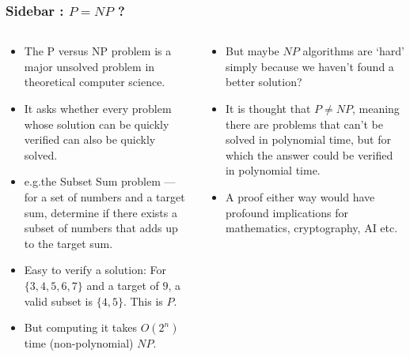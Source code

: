 \begin{frame}[fragile]
\frametitle{Sidebar : $P=NP$ ?}
\begin{columns}[T]

\begin{column}{0.45\textwidth}
\begin{itemize}[<+->]
\item The P versus NP problem is a major unsolved problem in theoretical computer science.
\item It asks whether every problem whose solution can be quickly verified can also be quickly solved.
\item e.g.the Subset Sum problem — for a set of numbers and a target sum, determine if there exists a subset of numbers that adds up to the target sum.
\item Easy to verify a solution: For $\{3,4,5,6,7\}$ and a target of $9$, a valid subset is $\{4,5\}$. This is $P$.
\item But computing it takes $O(2^n)$ time (non-polynomial) $NP$.
\end{itemize}
\end{column}

\pause
\begin{column}{0.45\textwidth}
\begin{itemize}[<+->]
\item But maybe $NP$ algorithms are `hard' simply because we haven't found a better solution?
\item It is thought that $P \neq NP$, meaning there are problems that can't be solved in polynomial time, but for which the answer could be verified in polynomial time.
\item A proof either way would have profound implications for mathematics, cryptography, AI etc.
\end{itemize}
\end{column}

\end{columns}
\end{frame}

